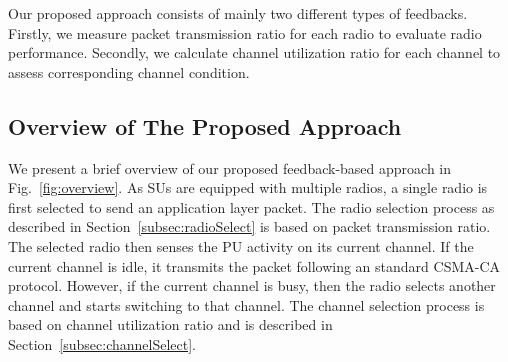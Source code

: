 \documentclass[letterpaper,conference]{IEEEtran}
\begin{document}
Our proposed approach consists of mainly two different types of feedbacks. Firstly, we measure packet transmission ratio for each radio to evaluate radio performance. Secondly, we calculate channel utilization ratio for each channel to assess corresponding channel condition.

\subsection{Overview of The Proposed Approach}

We present a brief overview of our proposed feedback-based approach in Fig.~\ref{fig:overview}. As SUs are equipped with multiple radios, a single radio is first selected to send an application layer packet. The radio selection process as described in Section~\ref{subsec:radioSelect} is based on packet transmission ratio. The selected radio then senses the PU activity on its current channel. If the current channel is idle, it transmits the packet following an standard CSMA-CA protocol. However, if the current channel is busy, then the radio selects another channel and starts switching to that channel. The channel selection process is based on channel utilization ratio and is described in Section~\ref{subsec:channelSelect}.
\end{document}
